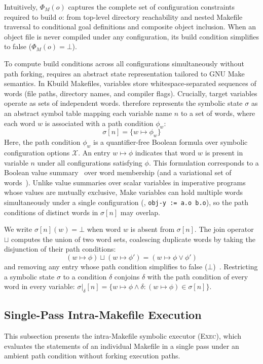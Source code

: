 \documentclass[acmsmall,screen,review,anonymous,nonacm]{acmart}
\begin{document}
  Intuitively, $\Phi_M(o)$ captures the complete set of configuration constraints required to build $o$: from top-level directory reachability and nested Makefile traversal to conditional goal definitions and composite object inclusion.
  When an object file is never compiled under any configuration, its build condition simplifies to false ($\Phi_M(o) = \bot$).

  To compute build conditions across all configurations simultaneously without path forking, \tool{} requires an abstract state representation tailored to GNU Make semantics.
  In Kbuild Makefiles, variables store whitespace-separated sequences of words (file paths, directory names, and compiler flags).
  Crucially, target variables operate as sets of independent words.
  \tool{} therefore represents the symbolic state $\sigma$ as an abstract symbol table mapping each variable name $n$ to a set of words, where each word $w$ is associated with a path condition $\phi_w$:
  $$\sigma[n] = \{ w \mapsto \phi_w \}$$
  Here, the path condition $\phi_w$ is a quantifier-free Boolean formula over symbolic configuration options $\mathcal{X}$.
  An entry $w \mapsto \phi$ indicates that word $w$ is present in variable $n$ under all configurations satisfying $\phi$.
  This formulation corresponds to a Boolean value summary~\cite{sen2015multise} over word membership (and a variational set of words~\cite{walkingshaw2014variational}).
  Unlike value summaries over scalar variables in imperative programs whose values are mutually exclusive, Make variables can hold multiple words simultaneously under a single configuration (\eg, \texttt{obj-y := a.o b.o}), so the path conditions of distinct words in $\sigma[n]$ may overlap.

  We write $\sigma[n](w) = \bot$ when word $w$ is absent from $\sigma[n]$.
  The join operator $\sqcup$ computes the union of two word sets, coalescing duplicate words by taking the disjunction of their path conditions:
  $$(w \mapsto \phi) \sqcup (w \mapsto \phi') = (w \mapsto \phi \lor \phi')$$
  and removing any entry whose path condition simplifies to false ($\bot$)~\cite{sen2015multise}.
  Restricting a symbolic state $\sigma$ to a condition $\delta$ conjoins $\delta$ with the path condition of every word in every variable: $\sigma|_\delta[n] = \{w \mapsto \phi \land \delta : (w \mapsto \phi) \in \sigma[n]\}$.

  \subsection{Single-Pass Intra-Makefile Execution}\label{sec:approach:intra}
  \label{sec:approach:assign}\label{sec:approach:expand}\label{sec:approach:merge}
  This subsection presents the intra-Makefile symbolic executor (\textsc{Exec}), which evaluates the statements of an individual Makefile in a single pass under an ambient path condition without forking execution paths.
\end{document}
